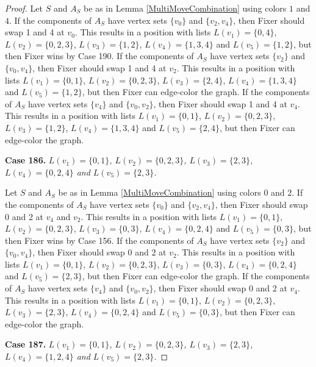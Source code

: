\documentclass[12pt]{amsart}
\theoremstyle{plain}
\theoremstyle{definition}
\theoremstyle{remark}
\begin{document}
\begin{proof}
Let $S$ and $A_S$ be as in Lemma \ref{MultiMoveCombination} using colors $1$ and $4$. If the components of $A_S$ have vertex sets $\{v_0\}$ and $\{v_2, v_4\}$, then Fixer should swap 1 and 4 at $v_0$. This results in a position with lists $L(v_1) = \{0, 4\}$, $L(v_2) = \{0, 2, 3\}$, $L(v_3) = \{1, 2\}$, $L(v_4) = \{1, 3, 4\}$ and $L(v_5) = \{1, 2\}$, but then Fixer wins by Case 190.
If the components of $A_S$ have vertex sets $\{v_2\}$ and $\{v_0, v_4\}$, then Fixer should swap 1 and 4 at $v_2$. This results in a position with lists $L(v_1) = \{0, 1\}$, $L(v_2) = \{0, 2, 3\}$, $L(v_3) = \{2, 4\}$, $L(v_4) = \{1, 3, 4\}$ and $L(v_5) = \{1, 2\}$, but then Fixer can edge-color the graph.
If the components of $A_S$ have vertex sets $\{v_4\}$ and $\{v_0, v_2\}$, then Fixer should swap 1 and 4 at $v_4$. This results in a position with lists $L(v_1) = \{0, 1\}$, $L(v_2) = \{0, 2, 3\}$, $L(v_3) = \{1, 2\}$, $L(v_4) = \{1, 3, 4\}$ and $L(v_5) = \{2, 4\}$, but then Fixer can edge-color the graph.

\noindent\textbf{Case 186.  }\textit{$L(v_1) = \{0, 1\}$, $L(v_2) = \{0, 2, 3\}$, $L(v_3) = \{2, 3\}$, $L(v_4) = \{0, 2, 4\}$ and $L(v_5) = \{2, 3\}$.}

Let $S$ and $A_S$ be as in Lemma \ref{MultiMoveCombination} using colors $0$ and $2$. If the components of $A_S$ have vertex sets $\{v_0\}$ and $\{v_2, v_4\}$, then Fixer should swap 0 and 2 at $v_4$ and $v_2$. This results in a position with lists $L(v_1) = \{0, 1\}$, $L(v_2) = \{0, 2, 3\}$, $L(v_3) = \{0, 3\}$, $L(v_4) = \{0, 2, 4\}$ and $L(v_5) = \{0, 3\}$, but then Fixer wins by Case 156.
If the components of $A_S$ have vertex sets $\{v_2\}$ and $\{v_0, v_4\}$, then Fixer should swap 0 and 2 at $v_2$. This results in a position with lists $L(v_1) = \{0, 1\}$, $L(v_2) = \{0, 2, 3\}$, $L(v_3) = \{0, 3\}$, $L(v_4) = \{0, 2, 4\}$ and $L(v_5) = \{2, 3\}$, but then Fixer can edge-color the graph.
If the components of $A_S$ have vertex sets $\{v_4\}$ and $\{v_0, v_2\}$, then Fixer should swap 0 and 2 at $v_4$. This results in a position with lists $L(v_1) = \{0, 1\}$, $L(v_2) = \{0, 2, 3\}$, $L(v_3) = \{2, 3\}$, $L(v_4) = \{0, 2, 4\}$ and $L(v_5) = \{0, 3\}$, but then Fixer can edge-color the graph.

\noindent\textbf{Case 187.  }\textit{$L(v_1) = \{0, 1\}$, $L(v_2) = \{0, 2, 3\}$, $L(v_3) = \{2, 3\}$, $L(v_4) = \{1, 2, 4\}$ and $L(v_5) = \{2, 3\}$.}


\end{proof}
\end{document}
